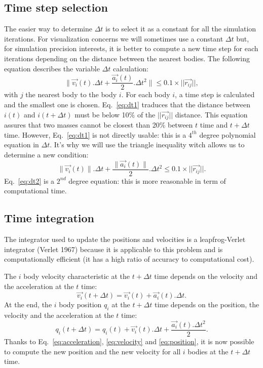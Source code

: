\subsection{Time step selection}
The easier way to determine $\Delta t$ is to select it as a constant for all the simulation iterations.
For visualization concerns we will sometimes use a constant $\Delta t$ but, for simulation precision interests, it is better to compute a new time step for each iterations depending on the distance between the nearest bodies.
The following equation describes the variable $\Delta t$ calculation:
\begin{equation}
\label{eq:dt1}
	\|\vec{v_i}(t) . \Delta t + \frac{\vec{a_i}(t)}{2} . \Delta t^2 \| \leq 0.1 \times ||\vec{r_{ij}}||,
\end{equation}
with $j$ the nearest body to the body $i$.
For each body $i$, a time step is calculated and the smallest one is chosen.
Eq.~\ref{eq:dt1} traduces that the distance between $i(t)$ and $i(t + \Delta t)$ must be below 10\% of the $||\vec{r_{ij}}||$ distance.
This equation assures that two masses cannot be closest than 20\% between $t$ time and $t + \Delta t$ time.
However, Eq.~\ref{eq:dt1} is not directly usable: this is a $4^{th}$ degree polynomial equation in $\Delta t$.
It's why we will use the triangle inequality witch allows us to determine a new condition:
\begin{equation}
\label{eq:dt2}
	\|\vec{v_i}(t)\| . \Delta t + \frac{\|\vec{a_i}(t)\|}{2} . \Delta t^2  \leq 0.1 \times ||\vec{r_{ij}}||.
\end{equation}
Eq.~\ref{eq:dt2} is a $2^{nd}$ degree equation: this is more reasonable in term of computational time.

\subsection{Time integration}
The integrator used to update the positions and velocities is a leapfrog-Verlet integrator (Verlet 1967) because it is applicable to this problem and is computationally efficient (it has a high ratio of accuracy to computational cost).

The $i$ body velocity characteristic at the $t + \Delta t$ time depends on the velocity and the acceleration at the $t$ time:
\begin{equation}
\label{eq:velocity}
	\vec{v_i}(t + \Delta t) = \vec{v_{i}}(t) + \vec{a_i}(t) . \Delta t.
\end{equation}
At the end, the $i$ body position $q_i$ at the $t + \Delta t$ time depends on the position, the velocity and the acceleration at the $t$ time:
\begin{equation}
\label{eq:position}
	q_i(t + \Delta t) = q_{i}(t) + \vec{v_{i}}(t) . \Delta t + \frac{\vec{a_i}(t) . \Delta t^2}{2}.
\end{equation}
Thanks to Eq.~\ref{eq:acceleration}, \ref{eq:velocity} and \ref{eq:position}, it is now possible to compute the new position and the new velocity for all $i$ bodies at the $t + \Delta t$ time.
